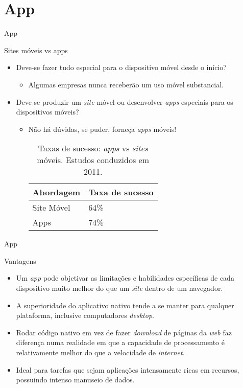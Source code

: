 \section{App}

\begin{frame}{App}
\begin{block}{Sites móveis vs apps}
  \begin{itemize}
    \item<1-> Deve-se fazer tudo especial para o dispositivo móvel desde o início?
      \begin{itemize}
        \item<2-> Algumas empresas nunca receberão um uso móvel substancial.
      \end{itemize}
    \item<3-> Deve-se produzir um \emph{site} móvel ou desenvolver \emph{apps} especiais para os dispositivos móveis?
      \begin{itemize}
        \item<4-> Não há dúvidas, se puder, forneça \emph{apps} móveis!
          \begin{table}
            \centering
            \begin{tabular}{ll}
              \toprule
              \textbf{Abordagem}                & \textbf{Taxa de sucesso}\\
              \midrule
              Site Móvel     & 64\% \\
              Apps           & 74\% \\
              \bottomrule
            \end{tabular}
            \parbox{0.50\textwidth}{\caption{Taxas de sucesso: \emph{apps} vs \emph{sites} móveis. Estudos conduzidos em 2011.}}
          \end{table}
      \end{itemize}
  \end{itemize}
\end{block}
\end{frame}

\begin{frame}{App}
\begin{block}{Vantagens}
  \begin{itemize}
    \item<1-> Um \emph{app} pode objetivar as limitações e habilidades específicas de cada dispositivo muito melhor do que um \emph{site} dentro de um navegador.
    \item<2-> A superioridade do aplicativo nativo tende a se manter para qualquer plataforma, inclusive computadores \emph{desktop}.
    \item<3-> Rodar código nativo em vez de fazer \emph{download} de páginas da \emph{web} faz diferença numa realidade em que a capacidade de processamento é relativamente melhor do que a velocidade de \emph{internet}.
    \item<4-> Ideal para tarefas que sejam aplicações intensamente ricas em recursos, possuindo intenso manuseio de dados.
  \end{itemize}
\end{block}
\end{frame}

